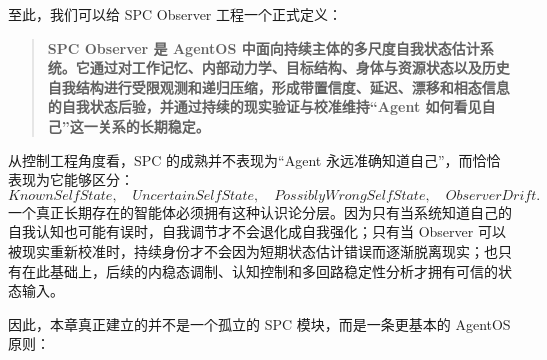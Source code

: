 至此，我们可以给 SPC Observer 工程一个正式定义：

\begin{quote}
\textbf{SPC Observer 是 AgentOS 中面向持续主体的多尺度自我状态估计系统。它通过对工作记忆、内部动力学、目标结构、身体与资源状态以及历史自我结构进行受限观测和递归压缩，形成带置信度、延迟、漂移和相态信息的自我状态后验，并通过持续的现实验证与校准维持“Agent 如何看见自己”这一关系的长期稳定。}
\end{quote}

从控制工程角度看，SPC 的成熟并不表现为“Agent 永远准确知道自己”，而恰恰表现为它能够区分：
\begin{equation}
\boxed{
KnownSelfState,
\quad
UncertainSelfState,
\quad
PossiblyWrongSelfState,
\quad
ObserverDrift.
}
\end{equation}
一个真正长期存在的智能体必须拥有这种认识论分层。因为只有当系统知道自己的自我认知也可能有误时，自我调节才不会退化成自我强化；只有当 Observer 可以被现实重新校准时，持续身份才不会因为短期状态估计错误而逐渐脱离现实；也只有在此基础上，后续的内稳态调制、认知控制和多回路稳定性分析才拥有可信的状态输入。

因此，本章真正建立的并不是一个孤立的 SPC 模块，而是一条更基本的 AgentOS 原则：

\begin{statementbox}
\centering
{}
\end{statementbox}
